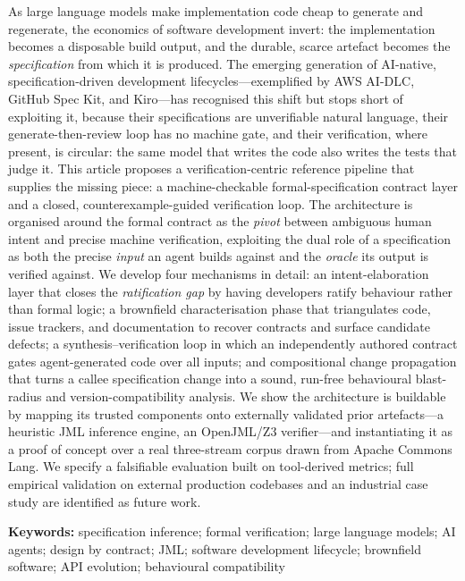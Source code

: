 \documentclass[11pt]{article}
\begin{document}
\noindent As large language models make implementation code cheap to generate and regenerate, the economics of software development invert: the implementation becomes a disposable build output, and the durable, scarce artefact becomes the \emph{specification} from which it is produced. The emerging generation of AI-native, specification-driven development lifecycles---exemplified by AWS AI-DLC, GitHub Spec Kit, and Kiro---has recognised this shift but stops short of exploiting it, because their specifications are unverifiable natural language, their generate-then-review loop has no machine gate, and their verification, where present, is circular: the same model that writes the code also writes the tests that judge it. This article proposes a verification-centric reference pipeline that supplies the missing piece: a machine-checkable formal-specification contract layer and a closed, counterexample-guided verification loop. The architecture is organised around the formal contract as the \emph{pivot} between ambiguous human intent and precise machine verification, exploiting the dual role of a specification as both the precise \emph{input} an agent builds against and the \emph{oracle} its output is verified against. We develop four mechanisms in detail: an intent-elaboration layer that closes the \emph{ratification gap} by having developers ratify behaviour rather than formal logic; a brownfield characterisation phase that triangulates code, issue trackers, and documentation to recover contracts and surface candidate defects; a synthesis--verification loop in which an independently authored contract gates agent-generated code over all inputs; and compositional change propagation that turns a callee specification change into a sound, run-free behavioural blast-radius and version-compatibility analysis. We show the architecture is buildable by mapping its trusted components onto externally validated prior artefacts---a heuristic JML inference engine, an OpenJML/Z3 verifier---and instantiating it as a proof of concept over a real three-stream corpus drawn from Apache Commons Lang. We specify a falsifiable evaluation built on tool-derived metrics; full empirical validation on external production codebases and an industrial case study are identified as future work.

\vspace{1em}

\noindent\textbf{Keywords:} specification inference; formal verification; large language models; AI agents; design by contract; JML; software development lifecycle; brownfield software; API evolution; behavioural compatibility
\end{document}
